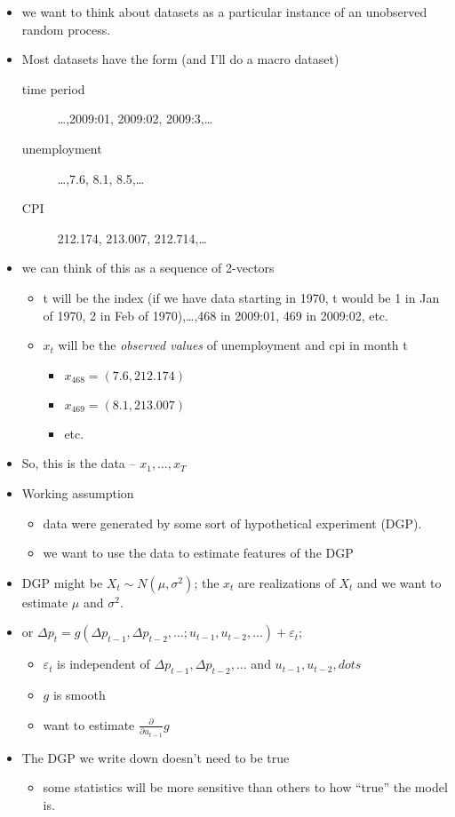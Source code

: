 \begin{itemize}
\item we want to think about datasets as a particular instance of an
      unobserved random process.
\item Most datasets have the form (and I'll do a macro dataset)
\begin{description}
\item[time period] \ldots{},2009:01, 2009:02, 2009:3,\ldots{}
\item[unemployment] \ldots{},7.6, 8.1, 8.5,\ldots{}
\item[CPI] 212.174, 213.007, 212.714,\ldots{}
\end{description}
\item we can think of this as a sequence of 2-vectors
\begin{itemize}
\item t will be the index (if we have data starting in 1970, t would
        be 1 in Jan of 1970, 2 in Feb of 1970),\ldots{},468 in 2009:01, 469
        in 2009:02, etc.
\item $x_t$ will be the \emph{observed values} of unemployment and cpi in
        month t
\begin{itemize}
\item $x_{468} = (7.6, 212.174)$
\item $x_{469} = (8.1, 213.007)$
\item etc.
\end{itemize}
\end{itemize}
\item So, this is the data -- $x_1,\dots,x_T$
\item Working assumption
\begin{itemize}
\item data were generated by some sort of hypothetical experiment (DGP).
\item we want to use the data to estimate features of the DGP
\end{itemize}
\item DGP might be $X_t \sim N(\mu, \sigma^2)$; the $x_t$ are
      realizations of $X_t$ and we want to estimate $\mu$ and
      $\sigma^2$.
\item or $\Delta p_t = g(\Delta p_{t-1}, \Delta p_{t-2}, \dots; u_{t-1}, u_{t-2}, \dots) + \varepsilon_t$;
\begin{itemize}
\item $\varepsilon_t$ is independent of $\Delta p_{t-1}, \Delta p_{t-2}, \dots$ and $u_{t-1}, u_{t-2}, dots$
\item $g$ is smooth
\item want to estimate $\frac{\partial}{\partial u_{t-1}} g$
\end{itemize}
\item The DGP we write down doesn't need to be true
\begin{itemize}
\item some statistics will be more sensitive than others to how ``true'' the model is.
\end{itemize}
\end{itemize}
